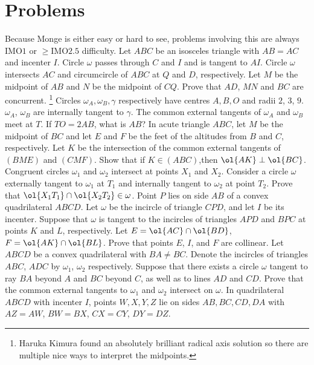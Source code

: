 \documentclass{seto}
\begin{document}
\section{Problems}
Because Monge is either easy or hard to see, problems involving this
are always IMO$1$ or $\ge$IMO$2.5$ difficulty.
 Let $ABC$ be an isosceles triangle with $AB=AC$ and incenter $I$. 
 Circle $\omega$ passes through $C$ and $I$ and is tangent to $AI$. 
 Circle $\omega$ intersects $AC$ and circumcircle of $ABC$ at $Q$ and $D$, respectively. 
 Let $M$ be the midpoint of $AB$ and $N$ be the midpoint of $CQ$. 
 Prove that $AD$, $MN$ and $BC$ are concurrent.
\footnote{Haruka Kimura found an absolutely brilliant radical axis solution
 so there are multiple nice ways to interpret the midpoints.}
\exercise[ARML 2024/I10] Circles $\omega_A,\omega_B,\gamma$ respectively 
have centres $A,B,O$ and radii $2$, $3$, $9$. $\omega_A$, $\omega_B$ are internally tangent to $\gamma$. The common external tangents of $\omega_A$ and $\omega_B$ meet at $T$. 
If $TO = 2AB$, what is $AB$?
 In acute triangle $ABC$, 
let $M$ be the midpoint of $BC$ and let $E$ and $F$ be the feet of the altitudes from $B$ and $C$, respectively. 
Let $K$ be the intersection of the common external tangents of $(BME)$ and $(CMF)$. 
Show that if $K\in (ABC)$,then $\ol{AK}\perp\ol{BC}$.
\exercise[EGMO 2016/4] Congruent circles $\omega_1$ and $\omega_2$ intersect at points $X_1$ and $X_2$. 
 Consider a circle $\omega$ externally tangent to $\omega_1$ at $T_1$ 
 and internally tangent to $\omega_2$ at point $T_2$. Prove that $\ol{X_1T_1}\cap\ol{X_2T_2}\in\omega$.
\exercise[ISL 2007/G8] Point $ P$ lies on side $AB$ of a convex quadrilateral 
 $ABCD$. Let $\omega$ be the incircle of triangle $CPD$, 
 and let $ I$ be its incenter. 
 Suppose that $\omega$ is tangent to the incircles of triangles $APD$ and 
 $BPC$ at points $K$ and $L$, respectively. 
 Let $E=\ol{AC}\cap\ol{BD}$, $F=\ol{AK}\cap\ol{BL}$.
 Prove that points $E$, $I$, and $F$ are collinear. 
\exercise[IMO 2008/6] Let $ABCD$ be a convex quadrilateral with $BA \neq BC$. 
Denote the incircles of triangles $ABC$, $ADC$ by $\omega_1$, $\omega_2$ respectively. 
Suppose that there exists a circle $\omega$ tangent to ray $BA$ beyond $A$ and $BC$ beyond $C$, 
as well as to lines $AD$ and $CD$.
Prove that the common external tangents to $\omega_1$ and $\omega_2$ intersect on $\omega$.
\exercise[ELMO SL 2024/G4, by me] In quadrilateral $ABCD$ with incenter $I$,
 points $W,X,Y,Z$ lie on sides $AB, BC,CD,DA$ with 
 $AZ=AW$, $BW=BX$, $CX=CY$, $DY=DZ$. 
\end{document}
